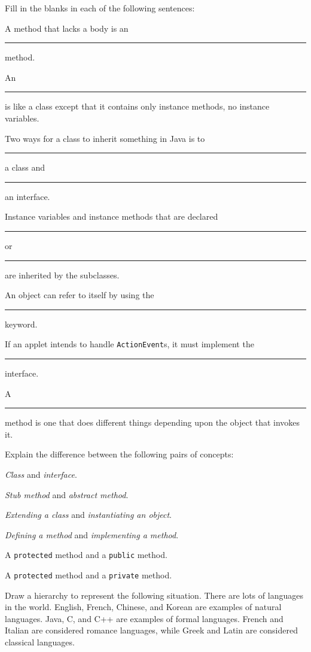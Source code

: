 \begin{EXRtwo}

\item  Fill in the blanks in each of the following sentences:

\begin{EXRtwoLL}
\baselineskip=13pt
\item  A method that lacks a body is an \rule{40pt}{0.5pt} method.
\item  An \rule{40pt}{0.5pt} is like a class except that it contains
only instance methods, no instance variables.
\item  Two ways for a class to inherit something in Java is to  \rule{40pt}{0.5pt}
a class and \rule{40pt}{0.5pt}  an interface.
\item  Instance variables and instance methods that are declared
 \rule{40pt}{0.5pt}  or \rule{40pt}{0.5pt}  are inherited by the subclasses.
\item  An object can refer to itself by using the \rule{40pt}{0.5pt} keyword.
\item  If an applet intends to handle {\tt ActionEvent}s, it must
implement the \rule{40pt}{0.5pt} interface.
\item   A \rule{40pt}{0.5pt} method is one 
that  does different things depending upon the object that invokes it.
\end{EXRtwoLL}

\baselineskip=11pt\item  Explain the difference between the following pairs of
concepts:

\begin{EXRtwoLL}
\item  {\it Class} and {\it interface}.
\item  {\it Stub method} and {\it abstract method}.
\item  {\it Extending a class} and {\it instantiating an object}.
\item  {\it Defining a method} and {\it implementing a method}.
\item  A {\tt protected} method and a {\tt public} method.
\item  A {\tt protected} method and a {\tt private} method.
\end{EXRtwoLL}

\item  Draw a hierarchy to represent the following situation.
There are lots of languages in the world.  English, French, Chinese,
and Korean are examples of natural languages.  Java, C, and C++ are
examples of formal languages.  French and Italian are considered
romance languages, while Greek and Latin are considered classical
languages.


\end{EXRtwo}
